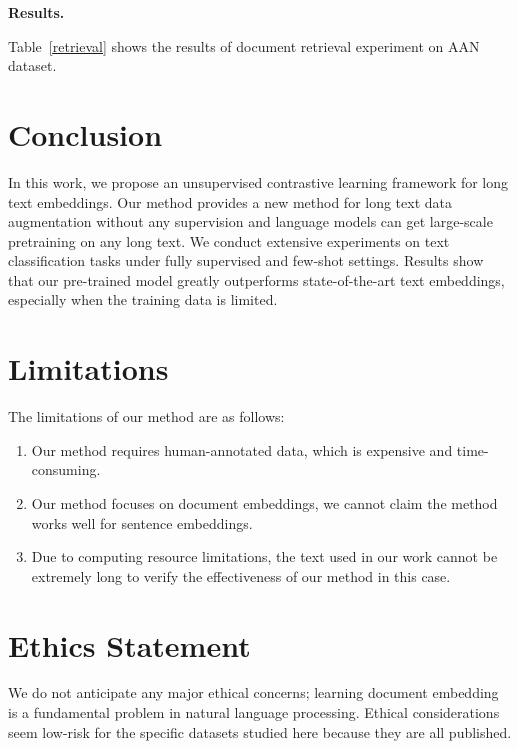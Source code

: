 \documentclass[11pt]{article}
\begin{document}
\textbf{Results.} 
\begin{table}
    \centering
    
    \caption{}
    \vspace{-3mm}
    \label{retrieval}
\end{table}
Table~\ref{retrieval} shows the results of document retrieval experiment on AAN dataset.

\section{Conclusion}
\label{sec:conclusion}
In this work, we propose an unsupervised contrastive learning framework for long text embeddings. 
Our method provides a new method for long text data augmentation without any supervision and language models can get large-scale pretraining on any long text. 
We conduct extensive experiments on text classification tasks under fully supervised and few-shot settings.
Results show that our pre-trained model greatly outperforms state-of-the-art text embeddings, especially when the training data is limited.

\section*{Limitations}
The limitations of our method are as follows:
\begin{enumerate}[nosep,leftmargin=*]
    \item Our method requires human-annotated data, which is expensive and time-consuming.
    \item Our method focuses on document embeddings, we cannot claim the method works well for sentence embeddings.
    \item Due to computing resource limitations, the text used in our work cannot be extremely long to verify the effectiveness of our method in this case.
\end{enumerate}

\section*{Ethics Statement}
We do not anticipate any major ethical concerns; learning document embedding is a fundamental problem in natural language processing. Ethical considerations seem low-risk for the specific datasets studied here because they are all published.

\end{document}
